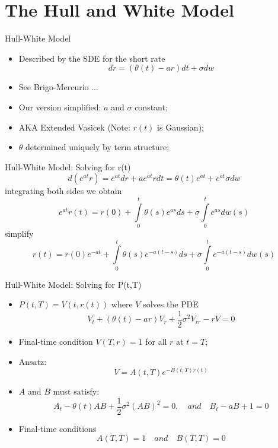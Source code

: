 \documentclass[11pt]{beamer}
\begin{document}
\section{The Hull and White Model}
\begin{frame}{Hull-White Model}
\begin{itemize}
\item Described by the SDE for the short rate
\begin{equation}\label{HW SDE}
dr = (\theta(t) - ar)dt + \sigma dw
\end{equation}
\item See Brigo-Mercurio ...
\item Our version simplified: $a$ and $\sigma$ constant;
\item AKA Extended Vasicek (Note: $r(t)$ is Gaussian);
\item $\theta$ determined uniquely by term structure;
\end{itemize}
\end{frame}
\begin{frame}{Hull-White Model: Solving for r(t)}
$$
d(e^{at} r) = e^{at} dr + ae^{at}rdt = \theta(t) e^{at} + e^{at} \sigma dw
$$
integrating both sides we obtain
$$
e^{at} r(t) = r(0) + \int\limits_{0}^t \theta(s) e^{as} ds + \sigma \int\limits_0^t e^{as} dw(s)
$$
simplify
$$
 r(t) = r(0)e^{-at} + \int\limits_{0}^t \theta(s) e^{-a(t-s)} ds + \sigma \int\limits_0^t e^{-a(t-s)} dw(s)
$$
\end{frame}
\begin{frame}{Hull-White Model: Solving for P(t,T)}
\begin{itemize}
\item $P(t,T) = V(t, r(t))$ where $V$ solves the PDE
$$
V_t + (\theta(t) - ar) V_r + \frac{1}{2} \sigma^2 V_{rr} - rV = 0
$$
\item Final-time condition $V(T,r) = 1$ for all $r$ at $t=T$;
\item Ansatz: 
$$
V=A(t,T) e^{-B(t,T)r(t)}
$$
\item $A$ and $B$ must satisfy:
$$
A_t - \theta(t) AB + \frac{1}{2} \sigma^2 (AB)^2 = 0, \quad and \quad B_t -aB +1 = 0
$$
\item Final-time conditions
$$A(T,T) =1 \quad and \quad B(T,T)=0$$
\end{itemize}
\end{frame}
\end{document}
